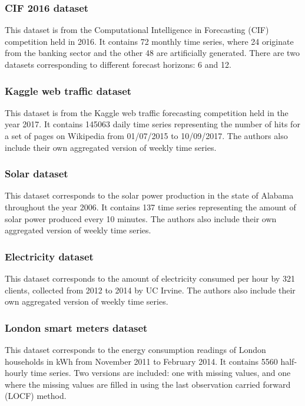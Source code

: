 \documentclass{article}
\begin{document}
\subsubsection{CIF 2016 dataset}
This dataset is from the Computational Intelligence in Forecasting (CIF) competition held in 2016. It contains 72 monthly time series, where 24 originate from the banking sector and the other 48 are artificially generated. There are two datasets corresponding to different forecast horizons: 6 and 12.

\subsubsection{Kaggle web traffic dataset}
This dataset is from the Kaggle web traffic forecasting competition held in the year 2017. It contains 145063 daily time series representing the number of hits for a set of pages on Wikipedia from 01/07/2015 to 10/09/2017. The authors also include their own aggregated version of weekly time series. 

\subsubsection{Solar dataset}
This dataset corresponds to the solar power production in the state of Alabama throughout the year 2006. It contains 137 time series representing the amount of solar power produced every 10 minutes. The authors also include their own aggregated version of weekly time series. 

\subsubsection{Electricity dataset}
This dataset corresponds to the amount of electricity consumed per hour by 321 clients, collected from 2012 to 2014 by UC Irvine. The authors also include their own aggregated version of weekly time series.

\subsubsection{London smart meters dataset}
This dataset corresponds to the energy consumption readings of London households in kWh from November 2011 to February 2014. It contains 5560 half-hourly time series. Two versions are included: one with missing values, and one where the missing values are filled in using the last observation carried forward (LOCF) method. 
\end{document}
